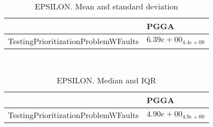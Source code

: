 \documentclass{article}
\begin{document}
\
\begin{table}
\caption{EPSILON. Mean and standard deviation}
\label{table:mean.EPSILON}
\centering
\begin{scriptsize}
\begin{tabular}{ll}
\hline &  PGGA\\
\hline
TestingPrioritizationProblemWFaults & \cellcolor{gray95}$  6.39e+00_{ 4.4e+00}$ \\
\hline
\end{tabular}
\end{scriptsize}
\end{table}
\
\begin{table}
\caption{EPSILON. Median and IQR}
\label{table:median.EPSILON}
\begin{scriptsize}
\centering
\begin{tabular}{ll}
\hline &  PGGA\\
\hline
TestingPrioritizationProblemWFaults & \cellcolor{gray95}$  4.90e+00_{ 4.9e+00}$ \\
\hline
\end{tabular}
\end{scriptsize}
\end{table}
\end{document}
